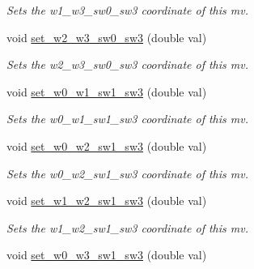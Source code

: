 \begin{DoxyCompactItemize}
\begin{DoxyCompactList}\small\item\em Sets the w1\-\_\-w3\-\_\-sw0\-\_\-sw3 coordinate of this mv. \end{DoxyCompactList}\item 
\hypertarget{classe3ga_1_1mv_ae2bdd32332338e6ed8a10f2f193fe43e}{void \hyperlink{classe3ga_1_1mv_ae2bdd32332338e6ed8a10f2f193fe43e}{set\-\_\-w2\-\_\-w3\-\_\-sw0\-\_\-sw3} (double val)}\label{classe3ga_1_1mv_ae2bdd32332338e6ed8a10f2f193fe43e}

\begin{DoxyCompactList}\small\item\em Sets the w2\-\_\-w3\-\_\-sw0\-\_\-sw3 coordinate of this mv. \end{DoxyCompactList}\item 
\hypertarget{classe3ga_1_1mv_a5d7f08ba4b1c0334be909d73731b5b7f}{void \hyperlink{classe3ga_1_1mv_a5d7f08ba4b1c0334be909d73731b5b7f}{set\-\_\-w0\-\_\-w1\-\_\-sw1\-\_\-sw3} (double val)}\label{classe3ga_1_1mv_a5d7f08ba4b1c0334be909d73731b5b7f}

\begin{DoxyCompactList}\small\item\em Sets the w0\-\_\-w1\-\_\-sw1\-\_\-sw3 coordinate of this mv. \end{DoxyCompactList}\item 
\hypertarget{classe3ga_1_1mv_ac87e6ba101d419f49a0acd89acaf8a30}{void \hyperlink{classe3ga_1_1mv_ac87e6ba101d419f49a0acd89acaf8a30}{set\-\_\-w0\-\_\-w2\-\_\-sw1\-\_\-sw3} (double val)}\label{classe3ga_1_1mv_ac87e6ba101d419f49a0acd89acaf8a30}

\begin{DoxyCompactList}\small\item\em Sets the w0\-\_\-w2\-\_\-sw1\-\_\-sw3 coordinate of this mv. \end{DoxyCompactList}\item 
\hypertarget{classe3ga_1_1mv_a3b762af15192a20f4a08cd8a5e77d403}{void \hyperlink{classe3ga_1_1mv_a3b762af15192a20f4a08cd8a5e77d403}{set\-\_\-w1\-\_\-w2\-\_\-sw1\-\_\-sw3} (double val)}\label{classe3ga_1_1mv_a3b762af15192a20f4a08cd8a5e77d403}

\begin{DoxyCompactList}\small\item\em Sets the w1\-\_\-w2\-\_\-sw1\-\_\-sw3 coordinate of this mv. \end{DoxyCompactList}\item 
\hypertarget{classe3ga_1_1mv_aa4f7a16308a18c57abea6f7f3e300f99}{void \hyperlink{classe3ga_1_1mv_aa4f7a16308a18c57abea6f7f3e300f99}{set\-\_\-w0\-\_\-w3\-\_\-sw1\-\_\-sw3} (double val)}\label{classe3ga_1_1mv_aa4f7a16308a18c57abea6f7f3e300f99}


\end{DoxyCompactItemize}
